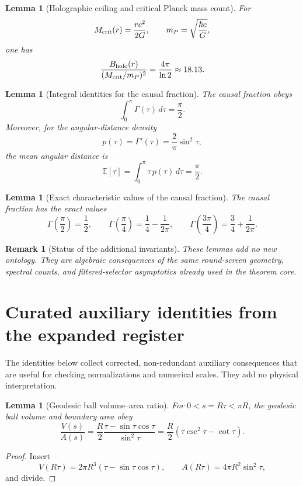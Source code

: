 \documentclass[11pt,a4paper]{article}
\newtheorem{lemma}[theorem]{Lemma}
\newtheorem{remark}[theorem]{Remark}
\begin{document}
\begin{lemma}[Holographic ceiling and critical Planck mass count]
For
\[
M_{\rm crit}(r)=\frac{rc^2}{2G},
\qquad
m_P=\sqrt{\frac{\hbar c}{G}},
\]
one has
\[
\frac{B_{\rm holo}(r)}
{(M_{\rm crit}/m_P)^2}
=
\frac{4\pi}{\ln2}
\approx18.13.
\]
\end{lemma}

\begin{lemma}[Integral identities for the causal fraction]
The causal fraction obeys
\[
\int_0^\pi \Gamma(\tau)\,d\tau
=
\frac{\pi}{2}.
\]
Moreover, for the angular-distance density
\[
p(\tau)=\Gamma'(\tau)=\frac{2}{\pi}\sin^2\tau,
\]
the mean angular distance is
\[
\mathbb E[\tau]
=
\int_0^\pi \tau\,p(\tau)\,d\tau
=
\frac{\pi}{2}.
\]
\end{lemma}

\begin{lemma}[Exact characteristic values of the causal fraction]
The causal fraction has the exact values
\[
\Gamma\!\left(\frac{\pi}{2}\right)=\frac12,
\qquad
\Gamma\!\left(\frac{\pi}{4}\right)=\frac14-\frac{1}{2\pi},
\qquad
\Gamma\!\left(\frac{3\pi}{4}\right)=\frac34+\frac{1}{2\pi}.
\]
\end{lemma}

\begin{remark}[Status of the additional invariants]
These lemmas add no new ontology.  They are algebraic consequences of the same round-screen geometry, spectral counts, and filtered-selector asymptotics already used in the theorem core.
\end{remark}


\section{Curated auxiliary identities from the expanded register}
\label{app:curated-auxiliary-identities}

The identities below collect corrected, non-redundant auxiliary consequences that are useful for checking normalizations and numerical scales.  They add no physical interpretation.

\begin{lemma}[Geodesic ball volume--area ratio]
For \(0<s=R\tau<\pi R\), the geodesic ball volume and boundary area obey
\[
\frac{V(s)}{A(s)}
=
\frac{R}{2}
\frac{\tau-\sin\tau\cos\tau}{\sin^2\tau}
=
\frac{R}{2}\left(\tau\csc^2\tau-\cot\tau\right).
\]
\end{lemma}
\begin{proof}
Insert
\[
V(R\tau)=2\pi R^3(\tau-\sin\tau\cos\tau),
\qquad
A(R\tau)=4\pi R^2\sin^2\tau,
\]
and divide.
\end{proof}
\end{document}
